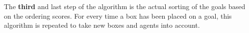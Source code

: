 The \textbf{third} and last step of the algorithm is the actual sorting of the goals based on the ordering scores. 
For every time a box has been placed on a goal, this algorithm is repeated to take new boxes and agents into account. 





